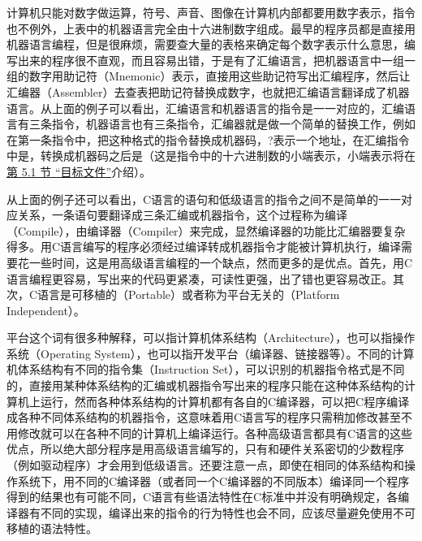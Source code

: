 计算机只能对数字做运算，符号、声音、图像在计算机内部都要用数字表示，指令也不例外，上表中的机器语言完全由十六进制数字组成。最早的程序员都是直接用机器语言编程，但是很麻烦，需要查大量的表格来确定每个数字表示什么意思，编写出来的程序很不直观，而且容易出错，于是有了汇编语言，把机器语言中一组一组的数字用助记符（Mnemonic）表示，直接用这些助记符写出汇编程序，然后让汇编器（Assembler）去查表把助记符替换成数字，也就把汇编语言翻译成了机器语言。从上面的例子可以看出，汇编语言和机器语言的指令是一一对应的，汇编语言有三条指令，机器语言也有三条指令，汇编器就是做一个简单的替换工作，例如在第一条指令中，把这种格式的指令替换成机器码，?表示一个地址，在汇编指令中是，转换成机器码之后是（这是指令中的十六进制数的小端表示，小端表示将在\hyperlink{db.ch18s05.id2770854}{第 5.\BookSplit{}1 节 “目标文件”}介绍）。



从上面的例子还可以看出，C语言的语句和低级语言的指令之间不是简单的一一对应关系，一条语句要翻译成三条汇编或机器指令，这个过程称为编译（Compile），由编译器（Compiler）来完成，显然编译器的功能比汇编器要复杂得多。用C语言编写的程序必须经过编译转成机器指令才能被计算机执行，编译需要花一些时间，这是用高级语言编程的一个缺点，然而更多的是优点。首先，用C语言编程更容易，写出来的代码更紧凑，可读性更强，出了错也更容易改正。其次，C语言是可移植的（Portable）或者称为平台无关的（Platform Independent）。



平台这个词有很多种解释，可以指计算机体系结构（Architecture），也可以指操作系统（Operating System），也可以指开发平台（编译器、链接器等）。不同的计算机体系结构有不同的指令集（Instruction Set），可以识别的机器指令格式是不同的，直接用某种体系结构的汇编或机器指令写出来的程序只能在这种体系结构的计算机上运行，然而各种体系结构的计算机都有各自的C编译器，可以把C程序编译成各种不同体系结构的机器指令，这意味着用C语言写的程序只需稍加修改甚至不用修改就可以在各种不同的计算机上编译运行。各种高级语言都具有C语言的这些优点，所以绝大部分程序是用高级语言编写的，只有和硬件关系密切的少数程序（例如驱动程序）才会用到低级语言。还要注意一点，即使在相同的体系结构和操作系统下，用不同的C编译器（或者同一个C编译器的不同版本）编译同一个程序得到的结果也有可能不同，C语言有些语法特性在C标准中并没有明确规定，各编译器有不同的实现，编译出来的指令的行为特性也会不同，应该尽量避免使用不可移植的语法特性。



